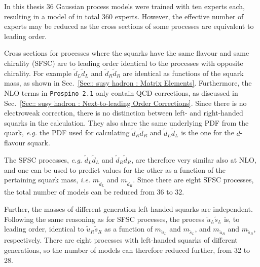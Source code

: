 \documentclass[twoside,english]{uiofysmaster}
\begin{document}
{{In this thesis 36 Gaussian process models were trained with ten experts each, resulting in a model of in total 360 experts. However, the effective number of experts may be reduced as the cross sections of some processes are equivalent to leading order. 


Cross sections for processes where the squarks have the same flavour and same chirality (SFSC) are to leading order identical to the processes with opposite chirality. For example $\widetilde{d}_L \widetilde{d}_L$ and $\widetilde{d}_R \widetilde{d}_R$ are identical as functions of the squark mass, as shown in Sec.~\ref{Sec:: susy hadron : Matrix Elements}. Furthermore, the NLO terms in \verb|Prospino 2.1| only contain QCD corrections, as discussed in Sec.~\ref{Sec:: susy hadron : Next-to-leading Order Corrections}. Since there is no electroweak correction, there is no distinction between left- and right-handed squarks in the calculation. They also share the same underlying PDF from the quark, \textit{e.g.} the PDF used for calculating $\widetilde{d}_R \widetilde{d}_R$ and $\widetilde{d}_L \widetilde{d}_L$ is the one for the $d$-flavour squark. 

The SFSC processes, \textit{e.g.} $\widetilde{d}_L \widetilde{d}_L$ and $\widetilde{d}_R \widetilde{d}_R$, are therefore very similar also at NLO, and one can be used to predict values for the other as a function of the pertaining squark mass, \textit{i.e.} $m_{\widetilde{d}_L}$ and $m_{\widetilde{d}_R}$. Since there are eight SFSC processes, the total number of models can be reduced from 36 to 32.


Further, the masses of different generation left-handed squarks are independent. Following the same reasoning as for SFSC processes, the process $\widetilde{u}_L \widetilde{s}_L$ is, to leading order, identical to $\widetilde{u}_R \widetilde{s}_R$ as a function of $m_{\widetilde{u}_L}$ and $m_{\widetilde{s}_L}$, and $m_{\widetilde{u}_R}$ and $m_{\widetilde{s}_R}$, respectively. There are eight processes with left-handed squarks of different generations, so the number of models can therefore reduced further, from 32 to 28.

}}
\end{document}
